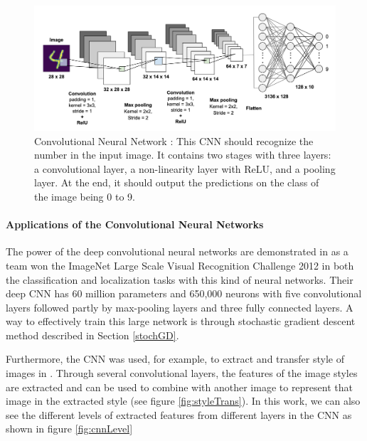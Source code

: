 \begin{figure}[tbh]
  \centering
    \includegraphics[width=\linewidth]{abbildungen/cnn.png}
  \caption{Convolutional Neural Network \cite{fig:cnn}: This CNN should recognize the number in the input image. It contains two stages with three layers: a convolutional layer, a non-linearity layer with ReLU, and a pooling layer. At the end, it should output the predictions on the class of the image being 0 to 9.} 
  \label{fig:cnn} 
\end{figure}

\paragraph*{Applications of the Convolutional Neural Networks}
The power of the deep convolutional neural networks are demonstrated in \cite{imgNet} as a team won the ImageNet Large Scale Visual Recognition Challenge 2012 \cite{ILSVRC2012} in both the classification and localization tasks with this kind of neural networks. Their deep CNN has 60 million parameters and 650,000 neurons with five convolutional layers followed partly by max-pooling layers and three fully connected layers. A way to effectively train this large network is through stochastic gradient descent method described in Section \ref{stochGD}.

Furthermore, the CNN was used, for example, to extract and transfer style of images in \cite{convImgStyle}. Through several convolutional layers, the features of the image styles are extracted and can be used to combine with another image to represent that image in the extracted style (see figure \ref{fig:styleTrans}). In this work, we can also see the different levels of extracted features from different layers in the CNN as shown in figure \ref{fig:cnnLevel}

